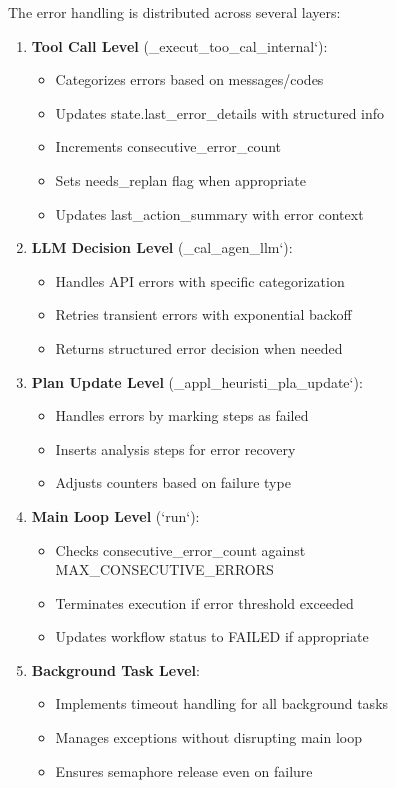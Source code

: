 \documentclass[12pt,a4paper]{article}
\begin{document}
The error handling is distributed across several layers:

\begin{enumerate}[label=\arabic*.]
    \item \textbf{Tool Call Level} (\1\_execut\1\_too\1\_cal\1\_internal`):
    \begin{itemize}
        \item Categorizes errors based on messages/codes
        \item Updates state.last\_error\_details with structured info
        \item Increments consecutive\_error\_count
        \item Sets needs\_replan flag when appropriate
        \item Updates last\_action\_summary with error context
    \end{itemize}
    \item \textbf{LLM Decision Level} (\1\_cal\1\_agen\1\_llm`):
    \begin{itemize}
        \item Handles API errors with specific categorization
        \item Retries transient errors with exponential backoff
        \item Returns structured error decision when needed
    \end{itemize}
    \item \textbf{Plan Update Level} (\1\_appl\1\_heuristi\1\_pla\1\_update`):
    \begin{itemize}
        \item Handles errors by marking steps as failed
        \item Inserts analysis steps for error recovery
        \item Adjusts counters based on failure type
    \end{itemize}
    \item \textbf{Main Loop Level} (`run`):
    \begin{itemize}
        \item Checks consecutive\_error\_count against MAX\_CONSECUTIVE\_ERRORS
        \item Terminates execution if error threshold exceeded
        \item Updates workflow status to FAILED if appropriate
    \end{itemize}
    \item \textbf{Background Task Level}:
    \begin{itemize}
        \item Implements timeout handling for all background tasks
        \item Manages exceptions without disrupting main loop
        \item Ensures semaphore release even on failure
    \end{itemize}
\end{enumerate}
\end{document}
